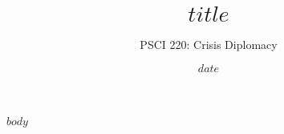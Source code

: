 \documentclass{tufte-handout}
\title{$title$}
\author{PSCI 220: Crisis Diplomacy}
\date{$date$}
\begin{document}
\maketitle

$body$
\end{document}
